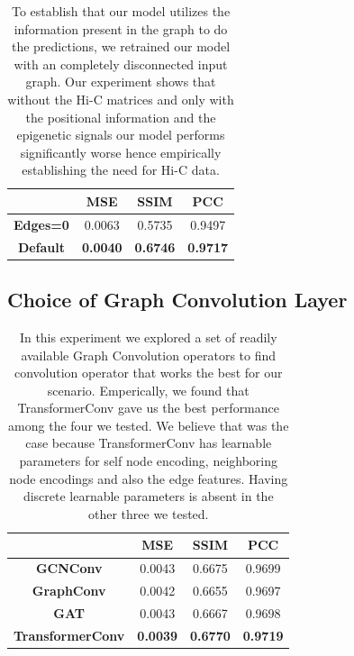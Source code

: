 \begin{table}[H]
\centering
\begin{tabular}{cccc}
\hline
                 & \textbf{MSE}    & \textbf{SSIM}   & \textbf{PCC}    \\ \hline
\textbf{Edges=0} & 0.0063          & 0.5735          & 0.9497          \\
\textbf{Default} & \textbf{0.0040} & \textbf{0.6746} & \textbf{0.9717}
\end{tabular}
\caption{
    \label{supp-tab:graph-formulation-eval} To establish that our model utilizes the information present in the graph to do the predictions, we retrained our model with an completely disconnected input graph. Our experiment shows that without the Hi-C matrices and only with the positional information and the epigenetic signals our model performs significantly worse hence empirically establishing the need for Hi-C data.  
}
\end{table}

\subsection{Choice of Graph Convolution Layer}
\begin{table}[H]
\centering
\begin{tabular}{cccc}
\hline
                         & \textbf{MSE}    & \textbf{SSIM}   & \textbf{PCC}    \\ \hline
\textbf{GCNConv}         & 0.0043          & 0.6675          & 0.9699          \\
\textbf{GraphConv}       & 0.0042          & 0.6655          & 0.9697          \\
\textbf{GAT}             & 0.0043          & 0.6667          & 0.9698          \\
\textbf{TransformerConv} & \textbf{0.0039} & \textbf{0.6770} & \textbf{0.9719} \\ \hline
\end{tabular}
\caption{
    \label{supp-tab:conv-operator-eval} In this experiment we explored a set of readily available Graph Convolution operators to find convolution operator that works the best for our scenario. Emperically, we found that TransformerConv gave us the best performance among the four we tested. We believe that was the case because TransformerConv has learnable parameters for self node encoding, neighboring node encodings and also the edge features. Having discrete learnable parameters is absent in the other three we tested. 
}
\end{table}




